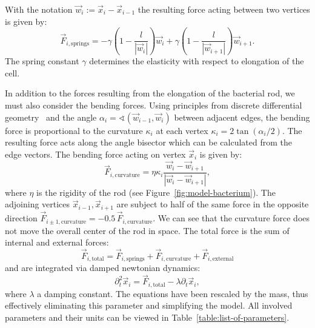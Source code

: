 With the notation $\vec{w}_i:=\vec{x}_i-\vec{x}_{i-1}$ the resulting force acting between two
vertices is given by:
\begin{equation}
    \vec{F}_{i,\text{springs}} =
        -\gamma\left(1 - \frac{l}{\left|\vec{w}_i\right|}\right) \vec{w}_i
        + \gamma\left(1 - \frac{l}{\left|\vec{w}_{i+1}\right|}\right) \vec{w}_{i+1}.
\end{equation}
The spring constant $\gamma$ determines the elasticity with respect to elongation of the cell.

In addition to the forces resulting from the elongation of the bacterial rod, we must also consider
the bending forces.
Using principles from discrete differential geometry~\cite{bobenko2008discrete, Amir2014_2} and the
angle $\alpha_i = \sphericalangle(\vec{w}_{i-1},\vec{w}_i)$ between adjacent edges, the bending
force is proportional to the curvature $\kappa_i$ at each vertex $\kappa_i = 2\tan(\alpha_i/2)$.
The resulting force acts along the angle bisector which can be calculated from the edge vectors.
The bending force acting on vertex $\vec{x}_i$ is given by:
\begin{equation}
    \vec{F}_{i,\text{curvature}} = \eta\kappa_i
        \frac{\vec{w}_i - \vec{w}_{i+1}}{|\vec{w}_i-\vec{w}_{i+1}|},
\end{equation}
where $\eta$ is the rigidity of the rod (see Figure~\ref{fig:model-bacterium}).
The adjoining vertices $\vec{x}_{i-1},\vec{x}_{i+1}$ are subject to half of the same force in the
opposite direction $\vec{F}_{i\pm 1,\text{curvature}} = -0.5\,\vec{F}_{i,\text{curvature}}$.
We can see that the curvature force does not move the overall center of the rod in space.
The total force is the sum of internal and external forces:
\begin{equation}
    \vec{F}_{i,\text{total}} = \vec{F}_{i,\text{springs}}+ \vec{F}_{i,\text{curvature}}
        + \vec{F}_{i,\text{external}}
\end{equation}
and are integrated via damped newtonian dynamics:
\begin{equation}
    \partial_t^2 \vec{x}_i = \vec{F}_{i,\text{total}} - \lambda \partial_t\vec{x}_i,
\end{equation}
where $\lambda$ a damping constant.
The equations have been rescaled by the mass, thus effectively
eliminating this parameter and simplifying the model. All involved parameters and their units can
be viewed in Table~\ref{table:list-of-parameters}.

